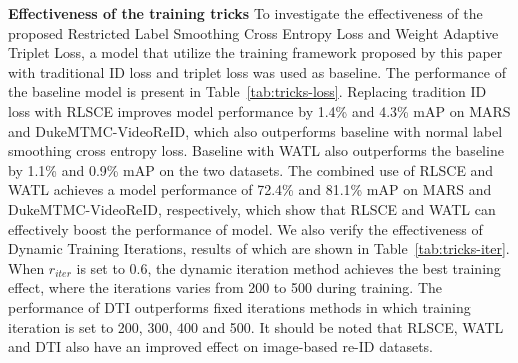 \documentclass[10pt,twocolumn,letterpaper]{article}
\begin{document}
\noindent \textbf{Effectiveness of the training tricks}
To investigate the effectiveness of the proposed Restricted Label Smoothing Cross Entropy Loss and Weight Adaptive Triplet Loss, a model that utilize the training framework proposed by this paper with traditional ID loss and triplet loss was used as baseline. The performance of the baseline model is present in Table~\ref{tab:tricks-loss}. Replacing tradition ID loss with RLSCE improves model performance by 1.4\% and 4.3\% mAP on MARS and DukeMTMC-VideoReID, which also outperforms baseline with normal label smoothing cross entropy loss. Baseline with WATL also outperforms the baseline by 1.1\% and 0.9\% mAP on the two datasets. The combined use of RLSCE and WATL achieves a model performance of 72.4\% and 81.1\% mAP on MARS and DukeMTMC-VideoReID, respectively, which show that RLSCE and WATL can effectively boost the performance of model. We also verify the effectiveness of Dynamic Training Iterations, results of which are shown in Table~\ref{tab:tricks-iter}. When $r_{iter}$ is set to 0.6, the dynamic iteration method achieves the best training effect, where the iterations varies from 200 to 500 during training. The performance of DTI outperforms fixed iterations methods in which training iteration is set to 200, 300, 400 and 500. It should be noted that RLSCE, WATL and DTI also have an improved effect on image-based re-ID datasets.

\begin{table}[]
\begin{threeparttable}
\begin{center}
\caption{Ablation studies on Restricted Label Smoothing Cross Entropy Loss and Weight Adaptive Triplet Loss. ``Baseline'' means the training framework proposed by this paper with traditional ID loss and triplet loss.}
\label{tab:tricks-loss}
\end{center}
\end{threeparttable}
\end{table}
\end{document}
